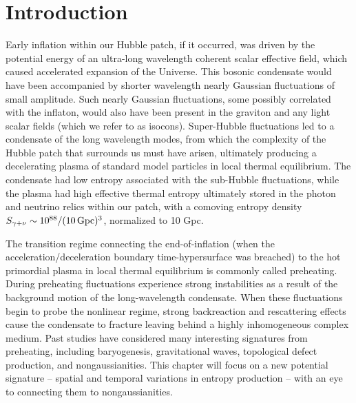 \documentclass[11pt,a4paper]{article}
\begin{document}





\section{Introduction}
Early inflation within our Hubble patch, if it occurred, was driven by the potential energy of an ultra-long wavelength coherent scalar effective field, which caused accelerated expansion of the Universe. This bosonic condensate would have been accompanied by shorter wavelength nearly Gaussian fluctuations of small amplitude. Such nearly Gaussian fluctuations, some possibly correlated with the inflaton, would also have been present in the graviton and any light scalar fields (which we refer to as isocons). Super-Hubble fluctuations led to a condensate of the long wavelength modes, from which the complexity of the Hubble patch that surrounds us must have arisen, ultimately producing a decelerating plasma of standard model particles in local thermal equilibrium. The condensate had low entropy associated with the sub-Hubble fluctuations, while the plasma had high effective thermal entropy ultimately stored  in the photon and neutrino relics within our patch, with a comoving entropy density $S_{\gamma +\nu} \sim  10^{88} /(10 \, {\rm Gpc })^3 $, normalized to 10 Gpc. 

The transition regime connecting the end-of-inflation (when the acceleration/deceleration boundary time-hypersurface was breached) to the hot primordial plasma in local thermal equilibrium is commonly called preheating. 
During preheating fluctuations experience strong instabilities as a result of the background motion of the long-wavelength condensate.
When these fluctuations begin to probe the nonlinear regime, strong backreaction and rescattering effects cause the condensate to fracture leaving behind a highly inhomogeneous complex medium.
Past studies have considered many interesting signatures from preheating, including baryogenesis, gravitational waves, topological defect production, and nongaussianities. This chapter will focus on a new potential signature -- spatial and temporal variations in entropy production -- with an eye to connecting them to nongaussianities. 
\end{document}
